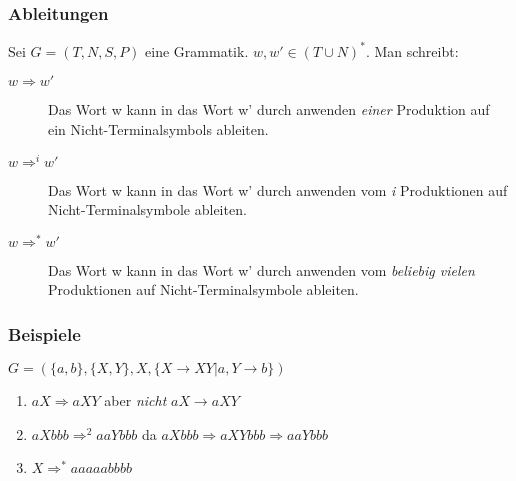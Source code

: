 \begin{frame}
  \frametitle{Ableitungen}
  \begin{definition}
    Sei $G = (T, N, S, P)$ eine Grammatik. $w, w' \in (T \cup N)^*$.
    Man schreibt:
    \begin{description}
      \item[$w \Longrightarrow w'$] Das Wort w kann in das Wort w' durch anwenden
        \emph{einer} Produktion auf ein Nicht-Terminalsymbols ableiten.
      \item[$w \Longrightarrow^i w'$] Das Wort w kann in das Wort w' durch anwenden vom
        \emph{i} Produktionen auf Nicht-Terminalsymbole ableiten.
      \item[$w \Longrightarrow^* w'$] Das Wort w kann in das Wort w' durch anwenden vom
        \emph{beliebig vielen} Produktionen auf Nicht-Terminalsymbole ableiten.
    \end{description}
  \end{definition}
\end{frame}

\begin{frame}
  \frametitle{Beispiele}
    $G = (\{a, b\}, \{X, Y\}, X, \{X \longrightarrow XY | a, Y \longrightarrow b\})$
  \begin{exampleblock}{}
    \begin{enumerate}
      \item $aX \Longrightarrow aXY$ aber \emph{nicht} $aX \longrightarrow aXY$
      \item $aXbbb \Longrightarrow^2 aaYbbb$ da $aXbbb \Longrightarrow aXYbbb \Longrightarrow aaYbbb$
      \item $ X \Longrightarrow^* aaaaabbbb$
    \end{enumerate}
  \end{exampleblock}
\end{frame}

